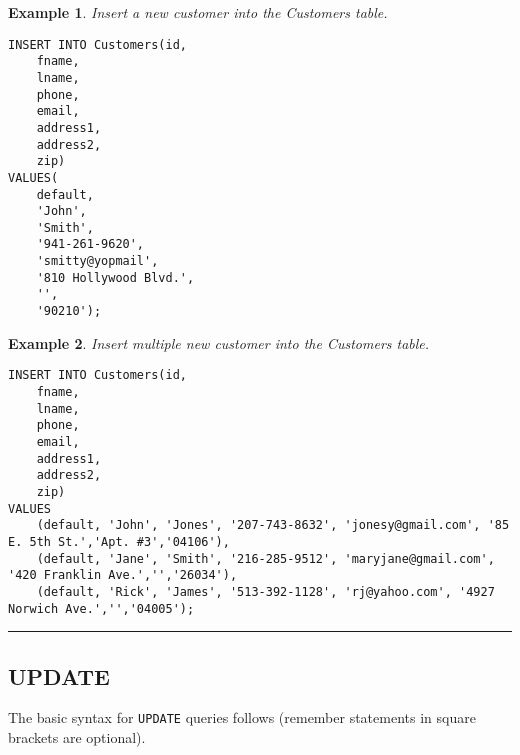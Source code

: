 \documentclass{article}
\newtheorem{example}{Example}
\begin{document}
  
 
 
 
 \begin{example}
 	Insert a new customer into the Customers table.
 \end{example}
 
 	
\begin{lstlisting}[frame=single]  
INSERT INTO Customers(id, 
	fname, 
    lname, 
    phone, 
    email, 
    address1, 
    address2, 
    zip) 
VALUES(
	default,
    'John', 
    'Smith', 
    '941-261-9620', 
    'smitty@yopmail', 
    '810 Hollywood Blvd.',
    '',
    '90210');
\end{lstlisting} 
	
	



 \begin{example}
 	Insert multiple new customer into the Customers table.
 \end{example}
	
\begin{lstlisting}[frame=single]  
INSERT INTO Customers(id, 
	fname, 
    lname, 
    phone, 
    email, 
    address1, 
    address2, 
    zip) 
VALUES
	(default, 'John', 'Jones', '207-743-8632', 'jonesy@gmail.com', '85 E. 5th St.','Apt. #3','04106'), 
	(default, 'Jane', 'Smith', '216-285-9512', 'maryjane@gmail.com', '420 Franklin Ave.','','26034'), 
	(default, 'Rick', 'James', '513-392-1128', 'rj@yahoo.com', '4927 Norwich Ave.','','04005');
\end{lstlisting} 
	



\hspace{-0.5cm}\rule[-0.101in]{\textwidth}{0.0025in}
  
  
















      
\subsection*{UPDATE}

The basic syntax for \texttt{UPDATE} queries follows (remember statements in square brackets are optional).
\end{document}
